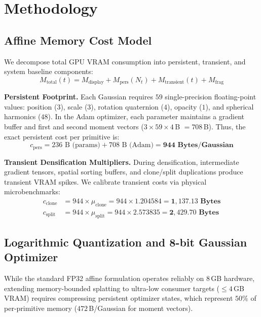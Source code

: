 \documentclass[10pt,twocolumn,letterpaper]{article}
\begin{document}
\section{Methodology}

\subsection{Affine Memory Cost Model}

We decompose total GPU VRAM consumption into persistent, transient, and system baseline components:
\begin{equation}
M_{\text{total}}(t) = M_{\text{display}} + M_{\text{pers}}(N_t) + M_{\text{transient}}(t) + M_{\text{frag}}
\end{equation}

\textbf{Persistent Footprint.} Each Gaussian requires $59$ single-precision floating-point values: position ($3$), scale ($3$), rotation quaternion ($4$), opacity ($1$), and spherical harmonics ($48$). In the Adam optimizer, each parameter maintains a gradient buffer and first and second moment vectors ($3 \times 59 \times 4$\,B $= 708$\,B). Thus, the exact persistent cost per primitive is:
\begin{equation}
c_{\text{pers}} = 236\text{ B (params)} + 708\text{ B (Adam)} = \mathbf{944\text{ Bytes/Gaussian}}
\end{equation}

\textbf{Transient Densification Multipliers.} During densification, intermediate gradient tensors, spatial sorting buffers, and clone/split duplications produce transient VRAM spikes. We calibrate transient costs via physical microbenchmarks:
\begin{align}
c_{\text{clone}} &= 944 \times \mu_{\text{clone}} = 944 \times 1.204584 = \mathbf{1{,}137.13\text{ Bytes}} \\
c_{\text{split}} &= 944 \times \mu_{\text{split}} = 944 \times 2.573835 = \mathbf{2{,}429.70\text{ Bytes}}
\end{align}

\subsection{Logarithmic Quantization and 8-bit Gaussian Optimizer}
\label{sec:int8_optimizer}

While the standard FP32 affine formulation operates reliably on 8\,GB hardware, extending memory-bounded splatting to ultra-low consumer targets ($\le 4$\,GB VRAM) requires compressing persistent optimizer states, which represent $50\%$ of per-primitive memory ($472$\,B/Gaussian for moment vectors).
\end{document}
